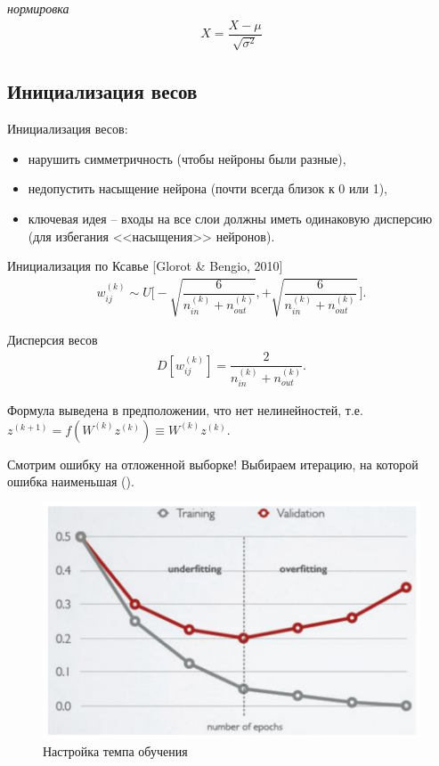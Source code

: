 \documentclass[%
	11pt,
	a4paper,
	utf8,
		]{article}
\begin{document}
\emph{нормировка}
\begin{align*}
	X = \dfrac{X - \mu}{\sqrt{\sigma^2}}
\end{align*}

\subsection{Инициализация весов}

Инициализация весов:
\begin{itemize}
	\item нарушить симметричность (чтобы нейроны были разные),
	
	\item недопустить насыщение нейрона (почти всегда близок к 0 или 1),
	
	\item ключевая идея -- входы на все слои должны иметь одинаковую дисперсию (для избегания <<насыщения>> нейронов).
\end{itemize}

Инициализация по Ксавье [Glorot \& Bengio, 2010]
\begin{align*}
	w_{ij}^{(k)} \sim U \Bigg[ - \sqrt{ \dfrac{ 6 }{ n_{in}^{(k)} + n_{out}^{(k)}} }, + \sqrt{ \dfrac{ 6 }{ n_{in}^{(k)} + n_{out}^{(k)}} } \, \Bigg].
\end{align*}

Дисперсия весов
\begin{align*}
	D[ w_{ij}^{(k)} ] = \dfrac{ 2 }{ n_{in}^{(k)} + n_{out}^{(k)} }.
\end{align*}

Формула выведена в предположении, что нет нелинейностей, т.е. $ z^{(k+1)} = f(W^{(k)} z^{(k)}) \equiv W^{(k)} z^{(k)} $.

Смотрим ошибку на отложенной выборке! Выбираем итерацию, на которой ошибка наименьшая ().

\begin{figure}[h]
	\centering
	\includegraphics[scale=0.5]{figures/lear_rate.png}
	\caption{ Настройка темпа обучения }\label{fig:lear_rate}
\end{figure}
\end{document}
